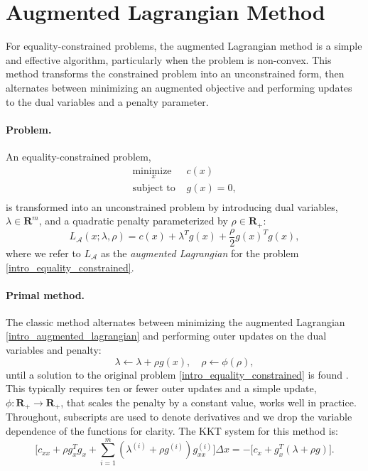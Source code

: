 \section{Augmented Lagrangian Method}
For equality-constrained problems, the augmented Lagrangian method \cite{bertsekas2014constrained} is a simple and effective algorithm, particularly when the problem is non-convex. This method transforms the constrained problem into an unconstrained form, then alternates between minimizing an augmented objective and performing updates to the dual variables and a penalty parameter.

\paragraph{Problem.}
An equality-constrained problem,
\begin{equation}
	\begin{array}{ll}
		\underset{x}{\mbox{minimize }}  & c(x) \\
		\mbox{subject to } & g(x) = 0, \\
	\end{array}
	\label{intro_equality_constrained}
\end{equation}
is transformed into an unconstrained problem by introducing dual variables, $\lambda \in \mathbf{R}^m$, and a quadratic penalty parameterized by $\rho \in \mathbf{R}_+$:
\begin{equation}
	L_{\mathcal{A}}(x; \lambda, \rho) = c(x) + \lambda^T g(x) + \frac{\rho}{2} g(x)^T g(x), 
	\label{intro_augmented_lagrangian}
\end{equation}
where we refer to $L_{\mathcal{A}}$ as the \emph{augmented Lagrangian} for the problem \eqref{intro_equality_constrained}.

\paragraph{Primal method.}
The classic method alternates between minimizing the augmented Lagrangian  \eqref{intro_augmented_lagrangian} and performing outer updates on the dual variables and penalty:
\begin{equation} 
	\lambda \leftarrow \lambda + \rho g(x), \quad \rho \leftarrow \phi (\rho), \label{intro_augmented_lagrangian_update}
\end{equation}
until a solution to the original problem \eqref{intro_equality_constrained} is found \cite{bertsekas2014constrained}. This typically requires ten or fewer outer updates and a simple update, $\phi : \mathbf{R}_+ \rightarrow \mathbf{R}_+$, that scales the penalty by a constant value, works well in practice.
Throughout, subscripts are used to denote derivatives and we drop the variable dependence of the functions for clarity. The KKT system for this method is:
\begin{equation} 
	\Big[c_{xx} + \rho g_x^T g_x + \sum \limits_{i = 1}^m (\lambda^{(i)} + \rho g^{(i)}) g_{xx}^{(i)} \Big] \Delta x = -\Big[c_x + g_x^T (\lambda + \rho g)\Big]. \label{intro_augmented_lagrangian_update} 
\end{equation}

